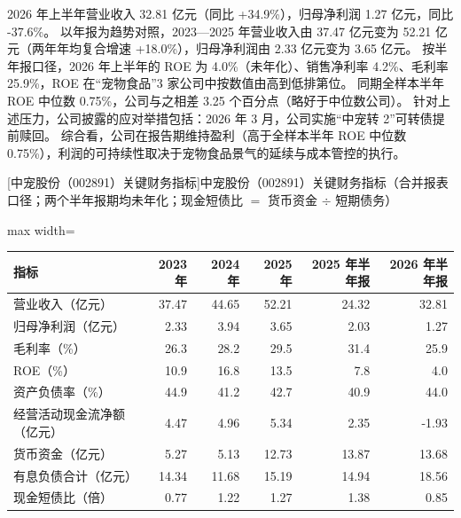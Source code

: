  2026 年上半年营业收入 32.81 亿元（同比 +34.9\%），归母净利润 1.27 亿元，同比 -37.6\%。 以年报为趋势对照，2023---2025 年营业收入由 37.47 亿元变为 52.21 亿元（两年年均复合增速 +18.0\%），归母净利润由 2.33 亿元变为 3.65 亿元。 按半年报口径，2026 年上半年的 ROE 为 4.0\%（未年化）、销售净利率 4.2\%、毛利率 25.9\%，ROE 在“宠物食品”3 家公司中按数值由高到低排第位。 同期全样本半年 ROE 中位数 0.75\%，公司与之相差 3.25 个百分点（略好于中位数公司）。 针对上述压力，公司披露的应对举措包括：2026 年 3 月，公司实施“中宠转 2”可转债提前赎回。 综合看，公司在报告期维持盈利（高于全样本半年 ROE 中位数 0.75\%），利润的可持续性取决于宠物食品景气的延续与成本管控的执行。

\begin{center}\small\setlength{\tabcolsep}{3.4pt}
[中宠股份（002891）关键财务指标]{中宠股份（002891）关键财务指标（合并报表口径；两个半年报期均未年化；现金短债比 $=$ 货币资金 $\div$ 短期债务）}
\begin{adjustbox}{max width=\textwidth}
\begin{tabular}{@{}lrrrrr@{}}
\toprule
指标 & 2023 年 & 2024 年 & 2025 年 & 2025 年半年报 & 2026 年半年报 \\
\midrule
营业收入（亿元） & 37.47 & 44.65 & 52.21 & 24.32 & 32.81 \\
归母净利润（亿元） & 2.33 & 3.94 & 3.65 & 2.03 & 1.27 \\
毛利率（\%） & 26.3 & 28.2 & 29.5 & 31.4 & 25.9 \\
ROE（\%） & 10.9 & 16.8 & 13.5 & 7.8 & 4.0 \\
资产负债率（\%） & 44.9 & 41.2 & 42.7 & 40.9 & 44.0 \\
经营活动现金流净额（亿元） & 4.47 & 4.96 & 5.34 & 2.35 & -1.93 \\
货币资金（亿元） & 5.27 & 5.13 & 12.73 & 13.87 & 13.68 \\
有息负债合计（亿元） & 14.34 & 11.68 & 15.19 & 14.94 & 18.56 \\
现金短债比（倍） & 0.77 & 1.22 & 1.27 & 1.38 & 0.85 \\
\bottomrule
\end{tabular}
\end{adjustbox}
\end{center}

